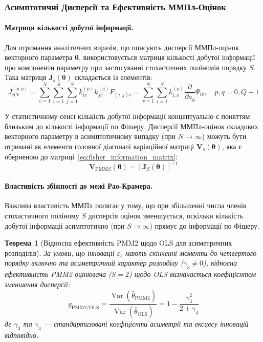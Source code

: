 \documentclass[12pt,a4paper]{article}
\newtheorem{theorem}{Теорема}[section]
\DeclareMathOperator{\Var}{Var}
\begin{document}
\subsubsection{Асимптотичні Дисперсії та Ефективність ММПл-Оцінок}

\paragraph{Матриця кількості добутої інформації.}

Для отримання аналітичних виразів, що описують дисперсії ММПл-оцінок векторного параметра $\boldsymbol{\theta}$, використовується матриця кількості добутої інформації про компоненти параметру при застосуванні стохастичних поліномів порядку $S$. Така матриця $\mathbf{J}_s(\boldsymbol{\theta})$ складається із елементів:
\begin{equation}
\label{eq:fisher_information_matrix}
J_{SN}^{(p,q)} = \sum_{v=1}^{N} \sum_{i=1}^{S} \sum_{j=1}^{S} k_{iv}^{(p)} k_{jv}^{(q)} F_{(i,j)v} = \sum_{v=1}^{N} \sum_{i=1}^{S} k_{i,v}^{(p)} \frac{\partial}{\partial a_q} \Psi_{iv}, \quad p,q=\overline{0,Q-1}
\end{equation}

У статистичному сенсі кількість добутої інформації концептуально є поняттям близьким до кількості інформації по Фішеру. Дисперсії ММПл-оцінок складових векторного параметру в асимптотичному випадку (при $N \to \infty$) можуть бути отримані як елементи головної діагоналі варіаційної матриці $\mathbf{V}_s(\boldsymbol{\theta})$, яка є оберненою до матриці~\eqref{eq:fisher_information_matrix}:
\begin{equation}
\label{eq:variance_matrix}
\mathbf{V}_{\text{PMM}S}(\boldsymbol{\theta}) = \left[\mathbf{J}_S(\boldsymbol{\theta})\right]^{-1}
\end{equation}

\paragraph{Властивість збіжності до межі Рао-Крамера.}

Важлива властивість ММПл полягає у тому, що при збільшенні числа членів стохастичного поліному $S$ дисперсія оцінок зменшується, оскільки кількість добутої інформації асимптотично (при $S \to \infty$) прямує до інформації по Фішеру.

\begin{theorem}[Відносна ефективність PMM2 щодо OLS для асиметричних розподілів]
\label{thm:pmm2_basic}
За умови, що інновації $\varepsilon_t$ мають скінченні моменти до четвертого порядку включно та асиметричний характер розподілу ($\gamma_3 \neq 0$), відносна ефективність PMM2 оцінювача ($S=2$) щодо OLS визначається коефіцієнтом зменшення дисперсії:
\begin{equation}
\label{eq:re_pmm2_ols}
g_{\text{PMM2/OLS}} = \frac{\Var(\hat{\theta}_{\text{PMM2}})}{\Var(\hat{\theta}_{\text{OLS}})} = 1 - \frac{\gamma_3^2}{2 + \gamma_4}
\end{equation}
де $\gamma_3$ та $\gamma_4$ --- стандартизовані коефіцієнти асиметрії та ексцесу інновацій відповідно.
\end{theorem}
\end{document}
